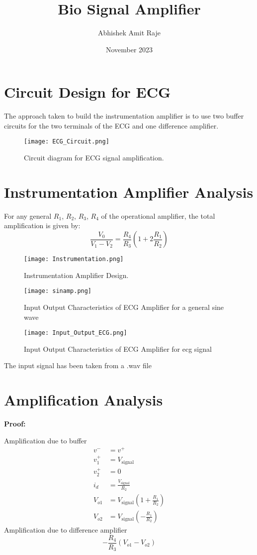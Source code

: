 \documentclass{article}
\title{Bio Signal Amplifier}
\author{Abhishek Amit Raje}
\date{November 2023}
\begin{document}
\maketitle

\section{Circuit Design for ECG}

The approach taken to build the instrumentation amplifier is to use two buffer circuits for the two terminals of the ECG and one difference amplifier.

\begin{figure}[h]
  \centering
  \texttt{[image: ECG\_Circuit.png]} 
  \caption{Circuit diagram for ECG signal amplification.}
  \label{fig:ecg-circuit}
\end{figure}

\section{Instrumentation Amplifier Analysis}
For any general \(R_1\), \(R_2\), \(R_3\), \(R_4\) of the operational amplifier, the total amplification is given by:
\[
\frac{V_0}{V_1 - V_2} = \frac{R_4}{R_3} \left(1 + 2 \frac{R_1}{R_2}\right)
\]

\begin{figure}[h]
  \centering
  \texttt{[image: Instrumentation.png]} 
  \caption{Instrumentation Amplifier Design.}
  \label{fig:instrumentation-amp}
\end{figure}
\begin{figure}[h]
  \centering
  \texttt{[image: sinamp.png]} 
  \caption{Input Output Characteristics of ECG Amplifier for a general sine wave}
  \label{fig:instrumentation-amp}
\end{figure}

\begin{figure}[h]
  \centering
  \texttt{[image: Input\_Output\_ECG.png]} 
  \caption{Input Output Characteristics of ECG Amplifier for ecg signal}
  \label{fig:instrumentation-amp}
\end{figure}
The input signal has been taken from a .wav file
\newpage
\section{Amplification Analysis}
\textbf{Proof:}

Amplification due to buffer
\begin{align*}
v^- &= v^+ \\
v_1^+ & = V_{\text{signal}} \\
v_2^+ & = 0 \\
i_d & = \frac{V_{\text{signal}}}{R_2} \\
V_{o1} & = V_{\text{signal}}\left(1 + \frac{R_1}{R_2}\right) \\
V_{o2} & = V_{\text{signal}}\left(-\frac{R_1}{R_2}\right)
\end{align*}
Amplification due to difference amplifier
\[
-\frac{R_4}{R_3}(V_{o1} - V_{o2})
\]
\end{document}
